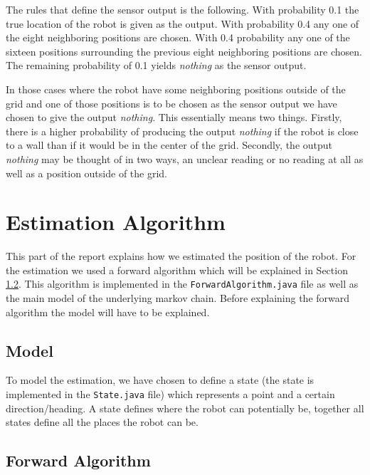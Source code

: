 \documentclass[a4paper]{article}
\begin{document}
The rules that define the sensor output is the following. With probability 0.1 the true location of the robot is given as the output. With probability 0.4 any one of the eight neighboring positions are chosen. With 0.4 probability any one of the sixteen positions surrounding the previous eight neighboring positions are chosen. The remaining probability of 0.1 yields \emph{nothing} as the sensor output.

In those cases where the robot have some neighboring positions outside of the grid and one of those positions is to be chosen as the sensor output we have chosen to give the output \emph{nothing}. This essentially means two things.  Firstly, there is a higher probability of producing the output \emph{nothing} if the robot is close to a wall than if it would be in the center of the grid. Secondly, the output \emph{nothing} may be thought of in two ways, an unclear reading or no reading at all as well as a position outside of the grid.




\section{Estimation Algorithm}
This part of the report explains how we estimated the position of the robot.
For the estimation we used a forward algorithm which will be explained in Section \ref{for_alg}. This algorithm is implemented in the \texttt{ForwardAlgorithm.java} file as well as the main model of the underlying markov chain. Before explaining the forward algorithm the model will have to be explained.

\subsection{Model}
To model the estimation, we have chosen to define a state (the state is implemented in the \texttt{State.java} file) which represents a point and a certain direction/heading. A state defines where the robot can potentially be, together all states define all the places the robot can be.


\subsection{Forward Algorithm}
\label{for_alg}
\end{document}
